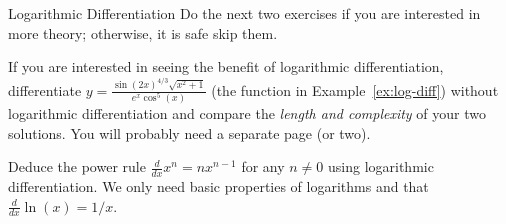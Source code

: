 \documentclass[../main.tex]{subfiles}
\begin{document}
\begin{lesson}{Logarithmic Differentiation}
  Do the next two exercises if you are interested in more theory; otherwise, it is safe skip them.

  \begin{example}
    If you are interested in seeing the benefit of logarithmic differentiation, differentiate \(y = \frac{\sin(2x)^{4/3} \sqrt{x^{2}+1}}{e^{x} \cos^{5}(x)}\) (the function in Example~\ref{ex:log-diff}) without logarithmic differentiation and compare the \emph{length and complexity} of your two solutions. You will probably need a separate page (or two).
  \end{example}

  \begin{example}
    Deduce the power rule \(\frac{d}{dx} x^{n} = nx^{n-1}\) for any \(n \ne 0\) using logarithmic differentiation. We only need basic properties of logarithms and that \(\tfrac{d}{dx} \ln(x) = 1/x\).
  
  \end{example}
\end{lesson}
\end{document}
